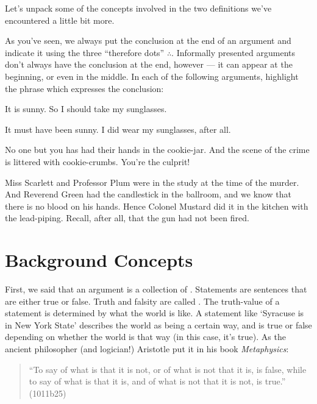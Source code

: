  
 \noindent Let's unpack some of the concepts involved in the two definitions we've encountered a little bit more.


\practiceproblems

As you've seen, we always put the conclusion at the end of an argument and indicate it using the three ``therefore dots'' $\therefore$.  Informally presented arguments don't always have the conclusion at the end, however --- it can appear at the beginning, or even in the middle.  In each of the following arguments, highlight the phrase which expresses the conclusion:

\begin{earg}
	\item It is sunny. So I should take my sunglasses.
	\item It must have been sunny. I did wear my sunglasses, after all.
	\item No one but you has had their hands in the cookie-jar. And the scene of the crime is littered with cookie-crumbs. You're the culprit!
	\item Miss Scarlett and Professor Plum were in the study at the time of the murder. And Reverend Green had the candlestick in the ballroom, and we know that there is no blood on his hands. Hence Colonel Mustard did it in the kitchen with the lead-piping. Recall, after all, that the gun had not been fired.
\end{earg}


 
 \section{Background Concepts}\label{s:Background}
 
 First, we said that an argument is a collection of .  Statements are sentences that are either true or false.  Truth and falsity are called .  The truth-value of a statement is determined by what the world is like.  A statement like `Syracuse is in New York State' describes the world as being a certain way, and is true or false depending on whether the world is that way (in this case, it's true).   As the ancient philosopher (and logician!) Aristotle put it in his book \emph{Metaphysics}:

\begin{quote}
``To say of what is that it is not, or of what is not that it is, is false, while to say of what is that it is, and of what is not that it is not, is true.'' (1011b25)
\end{quote}

